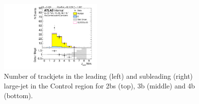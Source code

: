 \begin{figure}[htbp!]
\begin{center}
\includegraphics[width=0.45\textwidth,angle=-90]{figures/boosted/Control/b77_FourTag_Control_sublHCand_ntrk.pdf}
  \caption{Number of trackjets in the leading (left) and subleading (right) large-\R jet in the Control region for 2bs (top), 3b (middle) and 4b (bottom).}
  \label{fig:boosted-ntrk-Control}
\end{center}
\end{figure}

